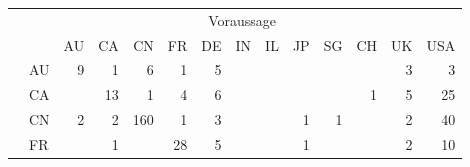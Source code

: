 \documentclass[bachelor,german]{info1thesis}
\begin{document}
\begin{table}[]
\centering
\begin{tabular}{@{}clrrrrrrrrrrrr@{}}
\multicolumn{1}{l}{}       & \multicolumn{13}{c}{Voraussage}                                   \\ \cmidrule(l){2-14} 
\multicolumn{1}{l}{}       &     & AU & CA & CN  & FR & DE & IN & IL & JP & SG & CH & UK & USA \\ \cmidrule(l){2-14} 
 & AU  & 9 & 1  & 6   & 1  & 5  &    &    &    &   &    & 3  & 3   \\
 & CA  &   & 13 & 1   & 4  & 6  &    &    &    &   & 1  & 5  & 25  \\
 & CN  & 2 & 2  & 160 & 1  & 3  &    &    & 1  & 1 &    & 2  & 40  \\
 & FR  &   & 1  &     & 28 & 5  &    &    & 1  &   &    & 2  & 10  \\

\end{tabular}
\end{table}
\end{document}
